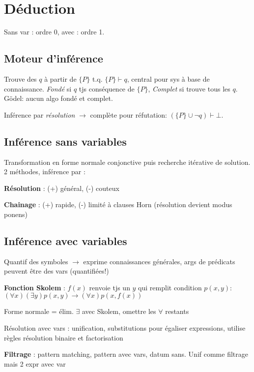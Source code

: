 \section*{Déduction}

Sans var : ordre 0, avec : ordre 1.

\subsection*{Moteur d'inférence}

Trouve des $q$ à partir de $\{P\}$ t.q. $\{P\} \vdash q$, central pour sys à base de connaissance. \emph{Fondé} si $q$ tjs conséquence de $\{P\}$, \emph{Complet} si trouve tous les $q$. Gödel: aucun algo fondé et complet. 

Inférence par \emph{résolution} $\rightarrow$ complète pour réfutation: $\left( \{P\} \cup \lnot q \right) \vdash \bot$.

\subsection*{Inférence sans variables}

Transformation en forme normale conjonctive puis recherche itérative de solution. 2 méthodes, inférence par :

\textbf{Résolution} : (+) général, (-) couteux

\textbf{Chainage} : (+) rapide, (-) limité à clauses Horn (résolution devient modus ponens)


\subsection*{Inférence avec variables}

Quantif des symboles $\rightarrow$ exprime connaissances générales, args de prédicats peuvent être des vars (quantifiées!)

\textbf{Fonction Skolem} : $f(x)$ renvoie tjs un $y$ qui remplit condition $p(x,y)$:\\
$(\forall x)(\exists y) p(x,y) \rightarrow (\forall x) p(x, f(x))$

Forme normale = élim. $\exists$ avec Skolem, omettre les $\forall$ restants

Résolution avec vars : unification, substitutions pour égaliser expressions, utilise règles résolution binaire et factorisation

\textbf{Filtrage} : pattern matching, pattern avec vars, datum sans. Unif comme filtrage mais 2 expr avec var


